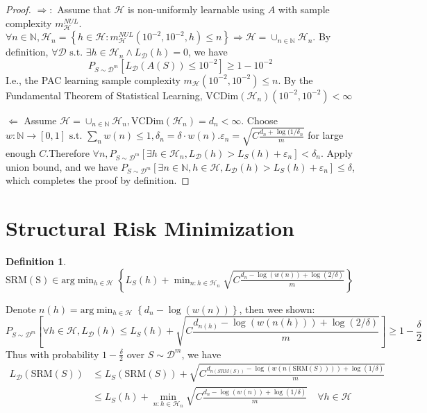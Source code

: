 \documentclass{book}
\newcommand{\N}{\mathbb{N}}
\newcommand{\st}{\text{ s.t. }}
\renewcommand{\H}{\mathcal{H}}
\newcommand{\D}{\mathcal{D}}
\newtheorem{Def}{Definition}[section]
\begin{document}
\begin{proof}
  $\mathbf{\Rightarrow}:$ Assume that $\H$ is non-uniformly learnable using $A$ with sample complexity $m_{\H}^{NUL}$. $\forall n\in\N, \H_n=\left\{ h\in\H: m_{\H}^{NUL}\left( 10^{-2},10^{-2},h \right)\leq n \right\}\Rightarrow\H=\cup_{n\in\N}\H_n$. By definition, $\forall \D\st \exists h\in \H_n \wedge L_{\D}(h)=0$, we have 
\begin{equation}
P_{S\sim \D^m}\left[L_{\D}(A(S))\leq 10^{-2}  \right]\geq 1-10^{-2}
\end{equation}
I.e., the PAC learning sample complexity $m_{\H} \left( 10^{-2},10^{-2} \right)\leq n$. By the Fundamental Theorem of Statistical Learning, $\mathrm{VCDim}(\H_n)(10^{-2},10^{-2})<\infty$

$\mathbf{\Leftarrow}$ Assume $\H=\cup_{n\in\N}\H_n, \mathrm{VCDim}(\H_n)=d_n<\infty$. Choose $w:\N\rightarrow \left[ 0,1 \right]\st \sum_nw(n)\leq 1, \delta_n=\delta\cdot w(n). \varepsilon_n=\sqrt{C \frac{d_n+\log(1/\delta_n}{m}}$ for large enough $C$.Therefore $\forall n, P_{S\sim \D^m}\left[ \exists h\in\H_n,L_{\D}(h)> L_S(h)+\varepsilon_n \right]<\delta_n$. Apply union bound, and we have $P_{S\sim \D^m}\left[ \exists n\in\N, h\in\H, L_{\D}(h)>L_S(h)+\varepsilon_n\right]\leq \delta$, which completes the proof by definition.
\end{proof}

\section{Structural Risk Minimization}
\begin{Def}
  $\mathrm{SRM(S)}\in \mathrm{arg}\min_{h\in\H}\left\{ L_S(h)+\min_{n:h\in\H_n}\sqrt{C \frac{d_n-\log(w(n))+\log(2/\delta)}{m}} \right\}$
\end{Def}
  Denote $n(h)=\mathrm{arg}\min_{h\in\H}\left\{ d_n-\log(w(n)) \right\}$, then wee shown:
\begin{equation}
P_{S\sim \D^m} \left[ \forall h\in\H, L_{\D}(h)\leq L_{S}(h)+\sqrt{C \frac{d_{n(h)}-\log(w(n(h)))+\log(2/\delta)}{m}} \right]\geq 1-\frac{\delta}{2}
\end{equation}
Thus with probability $1-\frac{\delta}{2}$ over $S\sim \D^m$, we have 
\begin{align*}
  L_{\D}(\mathrm{SRM}(S))&\leq L_{S}(\mathrm{SRM}(S))+\sqrt{C \frac{d_{n(SRM(S))}-\log(w(n(\mathrm{SRM}(S))))+\log(1/\delta)}{m}}\\
  &\leq L_{S}(h)+\min_{n:h\in \H_n} \sqrt{C \frac{d_n-\log(w(n))+\log(1/\delta)}{m}}\quad\forall h\in \H
\end{align*}
\end{document}

